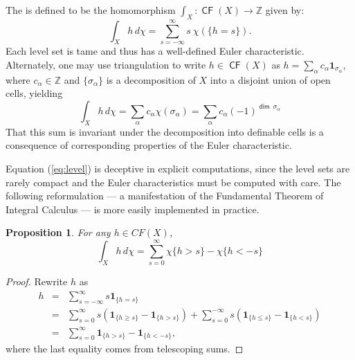 \documentclass{psapm-l}
\newtheorem{proposition}[theorem]{Proposition}
\theoremstyle{definition}
\theoremstyle{remark}
\numberwithin{equation}{section}
\begin{document}
The {{}} is defined to be the homomorphism $\int_X\colon{{{\operatorname{\mathsf{{CF}}}}}}(X)\to{{\mathbb Z}}$ given by:
\begin{equation}
\label{eq:level}
    \int_X h\,d\chi = \sum_{s=-\infty}^{\infty}s\ \chi(\{h=s\}) .
\end{equation}
Each level set is tame and thus has a well-defined Euler characteristic. Alternately, one may use triangulation to write $h\in{{{\operatorname{\mathsf{{CF}}}}}}(X)$ as $h=\sum_\alpha c_\alpha{{\mathbf{1}}}_{\sigma_\alpha}$, where $c_\alpha\in{{\mathbb Z}}$ and $\{\sigma_\alpha\}$ is a decomposition of $X$ into a disjoint union of open cells, yielding
\begin{equation}
\label{eq:simplices}
    \int_X h\,d\chi
    = \sum_\alpha c_\alpha\chi(\sigma_\alpha)
    = \sum_\alpha c_\alpha(-1)^{{{{\operatorname{\mathsf{{dim}}}}}}\ \sigma_\alpha}
\end{equation}
That this sum is invariant under the decomposition into definable cells is a consequence of corresponding properties of the Euler characteristic.

Equation (\ref{eq:level}) is deceptive in explicit computations, since the level sets are rarely compact and the Euler characteristics must be computed with care. The following reformulation --- a manifestation of the Fundamental Theorem of Integral Calculus --- is more easily implemented in practice.

\begin{proposition}
\label{prop:computation}
For any $h\in CF(X)$,
\begin{equation}
\label{eq:eulerexcursion}
    \int_Xh\,d\chi = \sum_{s=0}^\infty \chi\{h>s\} - \chi\{h<-s\}
\end{equation}
\end{proposition}

\begin{proof}
Rewrite $h$ as
\begin{eqnarray*}
h
&=& \sum_{s=-\infty}^\infty s{{\mathbf{1}}}_{\{h=s\}}
\\
&=& \sum_{s=0}^\infty
    s({{\mathbf{1}}}_{\{h\geq s\}}-{{\mathbf{1}}}_{\{h>s\}})
+ \sum_{s=0}^{-\infty}
    s({{\mathbf{1}}}_{\{h\leq s\}}-{{\mathbf{1}}}_{\{h<s\}})
\\
&=& \sum_{s=0}^\infty {{\mathbf{1}}}_{\{h>s\}} - {{\mathbf{1}}}_{\{h<-s\}} ,
\end{eqnarray*}
where the last equality comes from telescoping sums.
\end{proof}
\end{document}
